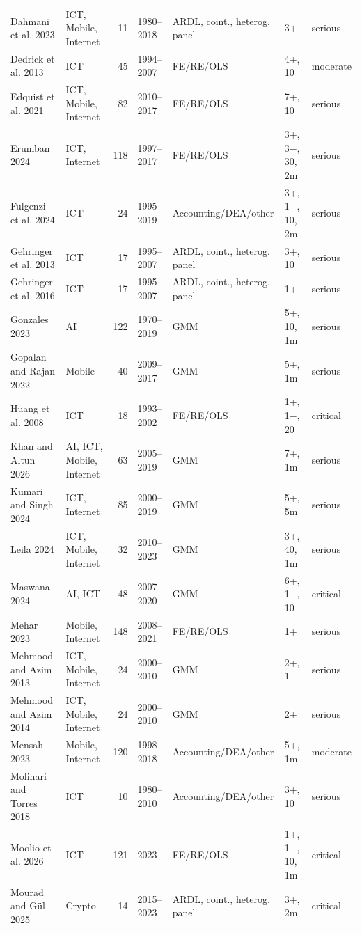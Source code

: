 {\begin{longtable}{@{}p{3.1cm} p{1.9cm} r l p{2.4cm} p{2.3cm} l@{}}
Dahmani et al. 2023 & ICT, Mobile, Internet & 11 & 1980--2018 & ARDL, coint., heterog. panel & 3+ & serious \\
Dedrick et al. 2013 & ICT & 45 & 1994--2007 & FE/RE/OLS & 4+, 10 & moderate \\
Edquist et al. 2021 & ICT, Mobile, Internet & 82 & 2010--2017 & FE/RE/OLS & 7+, 10 & serious \\
Erumban 2024 & ICT, Internet & 118 & 1997--2017 & FE/RE/OLS & 3+, 3$-$, 30, 2m & serious \\
Fulgenzi et al. 2024 & ICT & 24 & 1995--2019 & Accounting/DEA/other & 3+, 1$-$, 10, 2m & serious \\
Gehringer et al. 2013 & ICT & 17 & 1995--2007 & ARDL, coint., heterog. panel & 3+, 10 & serious \\
Gehringer et al. 2016 & ICT & 17 & 1995--2007 & ARDL, coint., heterog. panel & 1+ & serious \\
Gonzales 2023 & AI & 122 & 1970--2019 & GMM & 5+, 10, 1m & serious \\
Gopalan and Rajan 2022 & Mobile & 40 & 2009--2017 & GMM & 5+, 1m & serious \\
Huang et al. 2008 & ICT & 18 & 1993--2002 & FE/RE/OLS & 1+, 1$-$, 20 & critical \\
Khan and Altun 2026 & AI, ICT, Mobile, Internet & 63 & 2005--2019 & GMM & 7+, 1m & serious \\
Kumari and Singh 2024 & ICT, Internet & 85 & 2000--2019 & GMM & 5+, 5m & serious \\
Leila 2024 & ICT, Mobile, Internet & 32 & 2010--2023 & GMM & 3+, 40, 1m & serious \\
Maswana 2024 & AI, ICT & 48 & 2007--2020 & GMM & 6+, 1$-$, 10 & critical \\
Mehar 2023 & Mobile, Internet & 148 & 2008--2021 & FE/RE/OLS & 1+ & serious \\
Mehmood and Azim 2013 & ICT, Mobile, Internet & 24 & 2000--2010 & GMM & 2+, 1$-$ & serious \\
Mehmood and Azim 2014 & ICT, Mobile, Internet & 24 & 2000--2010 & GMM & 2+ & serious \\
Mensah 2023 & Mobile, Internet & 120 & 1998--2018 & Accounting/DEA/other & 5+, 1m & moderate \\
Molinari and Torres 2018 & ICT & 10 & 1980--2010 & Accounting/DEA/other & 3+, 10 & serious \\
Moolio et al. 2026 & ICT & 121 & 2023 & FE/RE/OLS & 1+, 1$-$, 10, 1m & critical \\
Mourad and Gül 2025 & Crypto & 14 & 2015--2023 & ARDL, coint., heterog. panel & 3+, 2m & critical \\

\end{longtable}}
